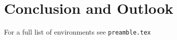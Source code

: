 \chapter{Conclusion and Outlook}
\label{ch:conclusion}

For a full list of environments see \texttt{preamble.tex}

